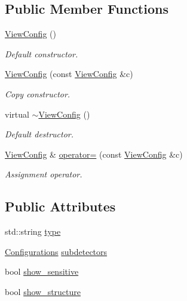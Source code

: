 \subsection*{Public Member Functions}
\begin{DoxyCompactItemize}
\item 
\hyperlink{class_d_d4hep_1_1_display_configuration_1_1_view_config_a9c9aa8312c88a38b22821eec6fff56d7}{ViewConfig} ()
\begin{DoxyCompactList}\small\item\em Default constructor. \item\end{DoxyCompactList}\item 
\hyperlink{class_d_d4hep_1_1_display_configuration_1_1_view_config_a0aa07c8fc66c04a825f00a06f8812bd3}{ViewConfig} (const \hyperlink{class_d_d4hep_1_1_display_configuration_1_1_view_config}{ViewConfig} \&c)
\begin{DoxyCompactList}\small\item\em Copy constructor. \item\end{DoxyCompactList}\item 
virtual \hyperlink{class_d_d4hep_1_1_display_configuration_1_1_view_config_ae166c3b81d063af96886587532ac2d77}{$\sim$ViewConfig} ()
\begin{DoxyCompactList}\small\item\em Default destructor. \item\end{DoxyCompactList}\item 
\hyperlink{class_d_d4hep_1_1_display_configuration_1_1_view_config}{ViewConfig} \& \hyperlink{class_d_d4hep_1_1_display_configuration_1_1_view_config_ad1dfdd8cd31d55cb2d6aac98d9ec0268}{operator=} (const \hyperlink{class_d_d4hep_1_1_display_configuration_1_1_view_config}{ViewConfig} \&c)
\begin{DoxyCompactList}\small\item\em Assignment operator. \item\end{DoxyCompactList}\end{DoxyCompactItemize}
\subsection*{Public Attributes}
\begin{DoxyCompactItemize}
\item 
std::string \hyperlink{class_d_d4hep_1_1_display_configuration_1_1_view_config_ae02fb914afdda0a021ff81d40c928844}{type}
\item 
\hyperlink{class_d_d4hep_1_1_display_configuration_ac43586ae2c70f106cc9027d452d383d7}{Configurations} \hyperlink{class_d_d4hep_1_1_display_configuration_1_1_view_config_ab1466448cad80dfdb76cc9f4c1f252b1}{subdetectors}
\item 
bool \hyperlink{class_d_d4hep_1_1_display_configuration_1_1_view_config_a94ea694c9eaca56a34957275f0602f8f}{show\_\-sensitive}
\item 
bool \hyperlink{class_d_d4hep_1_1_display_configuration_1_1_view_config_a354dde730ac96e0795b996a0c344c303}{show\_\-structure}
\end{DoxyCompactItemize}



